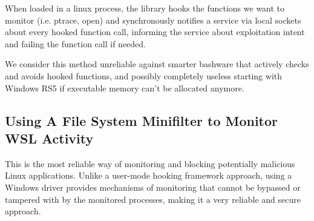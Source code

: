 \documentclass[conference]{IEEEtran}
\begin{document}
    \par{}
    When loaded in a linux process, the library hooks the functions we want to monitor (i.e. ptrace, open) and synchronously notifies a 
    service via local sockets about every hooked function call, informing the service about exploitation intent and failing the function call
    if needed.\\

    \par{}
    We consider this method unreliable against smarter bashware that actively checks and avoids hooked functions, and possibly completely useless
    starting with Windows RS5 if executable memory can't be allocated anymore.\\





\subsection{Using A File System Minifilter to Monitor WSL Activity}
    
    This is the most reliable way of monitoring and blocking potentially malicious Linux applications. Unlike a user-mode hooking framework
    approach, using a Windows driver provides mechanisms of monitoring that cannot be bypassed or tampered with by the monitored processes, making
    it a very reliable and secure approach.\\
\end{document}

